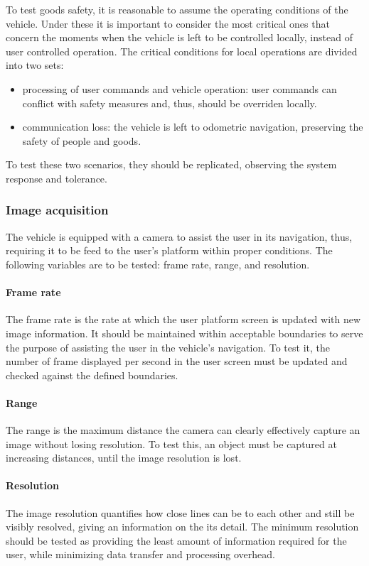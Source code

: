 To test goods safety, it is reasonable to assume the operating conditions of the
vehicle. Under these it is important to consider the most critical ones that
concern the moments when the vehicle is left to be controlled locally, instead
of user controlled operation. The critical conditions for local operations are
divided into two sets:
\begin{itemize}
\item processing of user commands and vehicle operation: user commands can
  conflict with safety measures and, thus, should be overriden locally.
\item communication loss: the vehicle is left to odometric navigation,
  preserving the safety of people and goods.
\end{itemize}
To test these two scenarios, they should be replicated, observing the system
response and tolerance.

\subsubsection{Image acquisition}%
\label{sec:orgb1f5c2a}
The vehicle is equipped with a camera to assist the user in its navigation,
thus, requiring it to be feed to the user's platform within proper conditions.
The following variables are to be tested: frame rate, range, and resolution.

\paragraph{Frame rate}%
\label{sec:frame-rate-test}
The frame rate is the rate at which the user platform screen is updated with new
image information. It should be maintained within acceptable boundaries to serve
the purpose of assisting the user in the vehicle's navigation. To test it, the
number of frame displayed per second in the user screen must be updated and
checked against the defined boundaries.

\paragraph{Range}%
\label{sec:range-test}
The range is the maximum distance the camera can clearly effectively capture an
image without losing resolution. To test this, an object must be captured at
increasing distances, until the image resolution is lost.

\paragraph{Resolution}%
\label{sec:resolution-test}
The image resolution quantifies how close lines can be to each other and still
be visibly resolved, giving an information on the its detail. The minimum
resolution should be tested as providing the least amount of information
required for the user, while minimizing data transfer and processing overhead.

